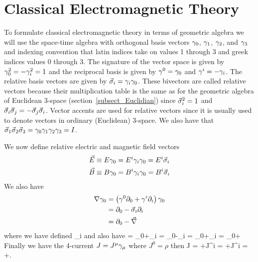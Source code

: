 \chapter{Classical Electromagnetic Theory}
To formulate classical electromagnetic theory in terms of geometric algebra we will use the space-time algebra with orthogonal basis vectors $\gamma_{0}$,
$\gamma_{1}$, $\gamma_{2}$, and $\gamma_{3}$ and indexing convention that latin indices take on values 1 through 3 and greek indices values 0 through 3. The
signature of the vector space is given by $\gamma_{0}^{2} = -\gamma_{i}^{2} = 1$ and the reciprocal basis is given by $\gamma^{0} = \gamma_{0}$ and $\gamma^{i} = -\gamma_{i}$. The
relative basis vectors are given by $\vec{\sigma}_{i} = \gamma_{i}\gamma_{0}$. These bivectors are called relative vectors because their multiplication table is the same
as for the geometric algebra of Euclidean 3-space (section~\ref{subsect_Euclidian}) since $\vec{\sigma}_{i}^{2} = 1$ and $\vec{\sigma}_{i}\vec{\sigma}_{j}=-\vec{\sigma}_{j}\vec{\sigma}_{i}$.  
Vector accents are used for relative vectors since it is usually used to denote vectors in ordinary (Euclidean) 3-space. We also have 
that $\vec{\sigma}_{1}\vec{\sigma}_{2}\vec{\sigma}_{3} = \gamma_{0}\gamma_{1}\gamma_{2}\gamma_{3} = I$.

We now define relative electric and magnetic field vectors
\begin{align}
	\vec{E} &\equiv E\gamma_{0} = E^{i}\gamma_{i}\gamma_{0} = E^{i}\vec{\sigma}_{i} \\
	\vec{B} &\equiv B\gamma_{0} = B^{i}\gamma_{i}\gamma_{0} = B^{i}\vec{\sigma}_{i}
\end{align}
We also have
\begin{align}
	\nabla\gamma_{0} &= \left ( {\gamma^{0}\partial_{0}+\gamma^{i}\partial_{i}} \right )\gamma_{0} \\
	            &= \partial_{0}-\vec{\sigma}_{i}\partial_{i} \\
	            &= \partial_{0}-\vec{\nabla}
\end{align}
where we have defined
\be
	\Nabla \equiv {}\partial_{i}
\ee
and also have
\be
	\nabla = \partial_{0}+\partial_{i} = \partial_{0}-\partial_{i} = \partial_{0}+\partial_{i} = \partial_{0}+\Nabla
\ee
Finally we have the 4-current $J = J^{\mu}\gamma_{\mu}$ where $J^{0}=\rho$ then
\be
	J = \rho+J^{i} = \rho+J^{i} = \rho+\Jv.
\ee
